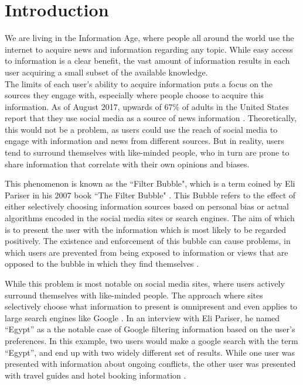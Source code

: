 \chapter{Introduction}
We are living in the Information Age, where people all around the world use
the internet to acquire news and information regarding any topic.
While easy access to information is a clear benefit, the vast amount of
information results in each user acquiring a small subset of the available
knowledge.\\
The limits of each user's ability to acquire information puts a focus on the
sources they engage with, especially where people choose to acquire this
information.
As of August 2017, upwards of 67\% of adults in the United States report that
they use social media as a source of news information \citep{journalism2017}.
Theoretically, this would not be a problem, as users could use the reach of
social media to engage with information and news from different sources.
But in reality, users tend to surround themselves with like-minded people, who
in turn are prone to share information that correlate with their own opinions
and biases.\nl

This phenomenon is known as the ``Filter Bubble", which is a term coined by Eli
Pariser in his 2007 book ``The Filter Bubble" \citep{pariser2011filter}.
This Bubble refers to the effect of either selectively choosing information
sources based on personal bias or actual algorithms encoded in the social media
sites or search engines.
The aim of which is to present the user with the information which is most
likely to be regarded positively.
The existence and enforcement of this bubble can cause problems, in which users
are prevented from being exposed to information or views that are opposed to the
bubble in which they find themselves \citep[p.59-73]{pariser2011filter}.\nl

While this problem is most notable on social media sites, where users actively
surround themselves with like-minded people.
The approach where sites selectively choose what information to present is
omnipresent and even applies to large search engines like Google
\citep{filterBubbleDef}.
In an interview with Eli Pariser, he named ``Egypt'' as a the notable case of
Google filtering information based on the user's preferences.
In this example, two users would make a google search with the term ``Egypt'',
and end up with two widely different set of results.
While one user was presented with information about ongoing conflicts, the other
user was presented with travel guides and hotel booking information
\citep{nusSduSearch}.